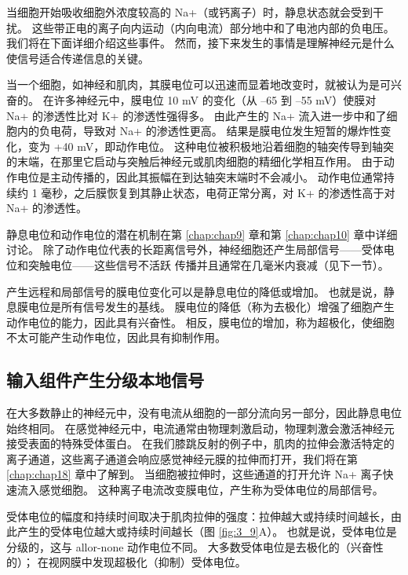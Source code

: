 当细胞开始吸收细胞外浓度较高的 Na+（或钙离子）时，静息状态就会受到干扰。 
这些带正电的离子向内运动（内向电流）部分地中和了电池内部的负电压。 
我们将在下面详细介绍这些事件。 
然而，接下来发生的事情是理解神经元是什么使信号适合传递信息的关键。


当一个细胞，如神经和肌肉，其膜电位可以迅速而显着地改变时，就被认为是可兴奋的。 
在许多神经元中，膜电位 10 mV 的变化（从 –65 到 –55 mV）使膜对 Na+ 的渗透性比对 K+ 的渗透性强得多。 
由此产生的 Na+ 流入进一步中和了细胞内的负电荷，导致对 Na+ 的渗透性更高。 
结果是膜电位发生短暂的爆炸性变化，变为 +40 mV，即动作电位。 
这种电位被积极地沿着细胞的轴突传导到轴突的末端，在那里它启动与突触后神经元或肌肉细胞的精细化学相互作用。 
由于动作电位是主动传播的，因此其振幅在到达轴突末端时不会减小。 
动作电位通常持续约 1 毫秒，之后膜恢复到其静止状态，电荷正常分离，对 K+ 的渗透性高于对 Na+ 的渗透性。


静息电位和动作电位的潜在机制在第 \ref{chap:chap9} 章和第 \ref{chap:chap10} 章中详细讨论。
除了动作电位代表的长距离信号外，神经细胞还产生局部信号——受体电位和突触电位——这些信号不活跃 传播并且通常在几毫米内衰减（见下一节）。


产生远程和局部信号的膜电位变化可以是静息电位的降低或增加。 
也就是说，静息膜电位是所有信号发生的基线。 
膜电位的降低（称为去极化）增强了细胞产生动作电位的能力，因此具有兴奋性。 
相反，膜电位的增加，称为超极化，使细胞不太可能产生动作电位，因此具有抑制作用。


\subsection{输入组件产生分级本地信号}
在大多数静止的神经元中，没有电流从细胞的一部分流向另一部分，因此静息电位始终相同。 
在感觉神经元中，电流通常由物理刺激启动，物理刺激会激活神经元接受表面的特殊受体蛋白。 
在我们膝跳反射的例子中，肌肉的拉伸会激活特定的离子通道，这些离子通道会响应感觉神经元膜的拉伸而打开，我们将在第 \ref{chap:chap18} 章中了解到。
当细胞被拉伸时，这些通道的打开允许 Na+ 离子快速流入感觉细胞。 
这种离子电流改变膜电位，产生称为受体电位的局部信号。


受体电位的幅度和持续时间取决于肌肉拉伸的强度：拉伸越大或持续时间越长，由此产生的受体电位越大或持续时间越长（图 \ref{fig:3_9}A）。 
也就是说，受体电位是分级的，这与 allor-none 动作电位不同。 
大多数受体电位是去极化的（兴奋性的）； 在视网膜中发现超极化（抑制）受体电位。

